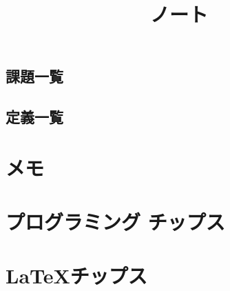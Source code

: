 \documentclass[6pt]{jreport}
\title{ノート}
\author{}
\begin{document}
\maketitle
\tableofcontents
\section*{課題一覧}
\section*{定義一覧}

\chapter{メモ}
%

%
%
%
%
%
%
%
%
%
%
\chapter{プログラミング チップス}

\chapter{\LaTeX チップス}




\end{document}
